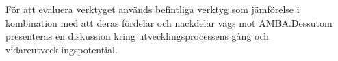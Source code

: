 För att evaluera verktyget används befintliga verktyg som jämförelse i
kombination med att deras fördelar och nackdelar vägs mot AMBA.\@ Dessutom
presenteras en diskussion kring utvecklingsprocessens gång och
vidareutvecklingspotential.
